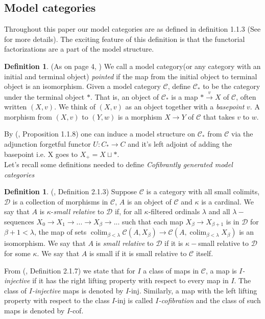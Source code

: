 \documentclass{article}
\newcommand{\cC}{\mathcal{C}}
\newcommand{\cD}{\mathcal{D}}
\DeclareMathOperator{\colim}{colim}
\theoremstyle{definition}
\newtheorem{definition}[theorem]{Definition}
\theoremstyle{remark}
\begin{document}
\subsection{Model categories}
Throughout this paper our model categories are as defined in \cite{MR1650134} definition 1.1.3 (See for more details). The exciting feature of this definition is that the functorial factorizations are a part of the model structure. 
\begin{definition}\label{def:pointedmodcat}
    (As on page 4, \cite{MR1650134}) We call a model category(or any category with an initial and terminal object) \textit{pointed} if the map from the initial object to terminal object is an isomorphism. Given a model category $\cC$, define $\cC_{*}$ to be the category under the terminal object $*$. That is, an object of $\cC_{*}$ is a map $* \xrightarrow{v} X$ of $\cC$, often written $(X,v)$. We think of $(X,v)$ as an object together with a \textit{basepoint} $v$. A morphism from $(X,v)$ to $(Y,w)$ is a morphism $X \rightarrow Y$ of $\cC$ that takes $v$ to $w$.
\end{definition}
By (\cite{MR1650134}, Proposition 1.1.8) one can induce a model structure on $\cC_{*}$ from $\cC$ via the adjunction forgetful functor $U: C_{*} \rightarrow C$ and it's left adjoint of adding the basepoint i.e. X goes to $X_{+}=X \sqcup *$.
\\Let's recall some definitions needed to define \textit{Cofibrantly generated model categories}
\begin{definition}
    (\cite{MR1650134}, Definition 2.1.3) Suppose $\cC$ is a category with all small colimits, $\cD$ is a collection of morphisms in $\cC$, $A$ is an object of $\cC$ and $\kappa$ is a cardinal. We say that $A$ is $\kappa$-\textit{small relative} to $\cD$ if, for all $\kappa$-filtered ordinals $\lambda$ and all $\lambda-$sequences $X_{0} \rightarrow X_{1} \rightarrow...\rightarrow X_{\beta}\rightarrow ...$ such that each map $X_{\beta} \rightarrow X_{\beta+1}$ is in $\cD$ for $\beta+1 < \lambda$, the map of sets $\colim_{\beta < \lambda} \cC(A,X_{\beta}) \rightarrow \cC(A, \colim_{\beta < \lambda} X_{\beta})$ is an isomorphism. We say that $A$ is \textit{small relative} to $\cD$ if  it is $\kappa-$small relative to $\cD$ for some $\kappa$. We say that $A$ is small if it is small relative to $\cC$ itself.
\end{definition}
From (\cite{MR1650134}, Definition 2.1.7) we state that for $I$ a class of maps in $\cC$, a map is \textit{$I$-injective} if it has the right lifting property with respect to every map in $I$. The class of \textit{$I$-injective} maps is denoted by $I$-inj. Similarly, a map with the left lifting property with respect to the class $I$-inj is called \textit{$I$-cofibration} and the class of such maps is denoted by $I$-cof. 
\end{document}
